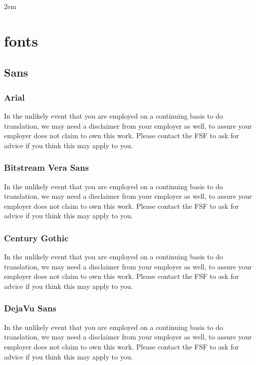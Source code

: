 \documentclass[a4paper,12pt,openany]{book}
\begin{document}
\parindent 2em

\chapter{fonts}

\section{Sans}
  \subsection{Arial}
    In the unlikely event that you are employed on a continuing basis to do
    translation, we may need a disclaimer from your employer as well, to assure
    your employer does not claim to own this work.  Please contact the FSF to
    ask for advice if you think this may apply to you.

  \subsection{Bitstream Vera Sans}
    In the unlikely event that you are employed on a continuing basis to do
    translation, we may need a disclaimer from your employer as well, to assure
    your employer does not claim to own this work.  Please contact the FSF to
    ask for advice if you think this may apply to you.

  \subsection{Century Gothic}
    In the unlikely event that you are employed on a continuing basis to do
    translation, we may need a disclaimer from your employer as well, to assure
    your employer does not claim to own this work.  Please contact the FSF to
    ask for advice if you think this may apply to you.

  \subsection{DejaVu Sans}
    In the unlikely event that you are employed on a continuing basis to do
    translation, we may need a disclaimer from your employer as well, to assure
    your employer does not claim to own this work.  Please contact the FSF to
    ask for advice if you think this may apply to you.
\end{document}
